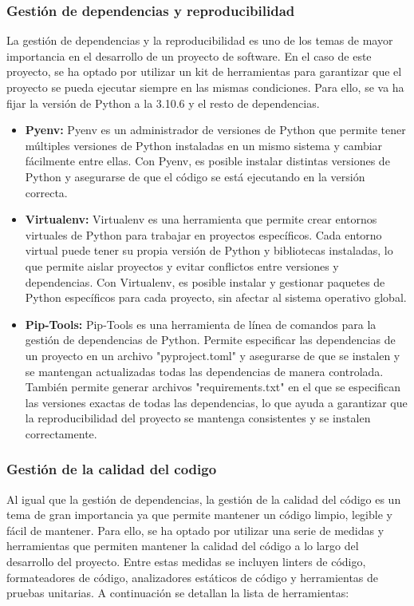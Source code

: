 \subsubsection{Gestión de dependencias y reproducibilidad}
La gestión de dependencias y la reproducibilidad es uno de los temas de mayor importancia en el 
desarrollo de un proyecto de software. En el caso de este proyecto, se ha optado por utilizar 
un kit de herramientas para garantizar que el proyecto se pueda ejecutar siempre en las mismas 
condiciones. Para ello, se va ha fijar la versión de Python a la 3.10.6 y el resto de dependencias. 

\begin{itemize}
    \item \textbf{Pyenv: } Pyenv\cite{pyenv} es un administrador 
    de versiones de Python que permite tener múltiples versiones de Python instaladas en un mismo sistema 
    y cambiar fácilmente entre ellas. Con Pyenv, es posible instalar distintas versiones de 
    Python y asegurarse de que el código se está ejecutando en la versión correcta. 
    
    \item \textbf{Virtualenv: } Virtualenv\cite{Virtualenv} es una herramienta que permite crear entornos virtuales de Python para trabajar 
    en proyectos específicos. Cada entorno virtual puede tener su propia versión de Python y bibliotecas instaladas, 
    lo que permite aislar proyectos y evitar conflictos entre versiones y dependencias. Con Virtualenv, 
    es posible instalar y gestionar paquetes de Python específicos para cada proyecto, sin afectar 
    al sistema operativo global.

    \item \textbf{Pip-Tools: } Pip-Tools\cite{Pip-tools} es una herramienta de línea de comandos para la gestión de 
    dependencias de Python. Permite especificar las dependencias de un proyecto en un archivo 
    "pyproject.toml" y asegurarse de que se instalen y se mantengan actualizadas todas las dependencias 
    de manera controlada. También permite generar archivos "requirements.txt" en el que se especifican las 
    versiones exactas de todas las dependencias, lo que ayuda a garantizar que la reproducibilidad del 
    proyecto se mantenga consistentes y se instalen correctamente.

\end{itemize}


\subsubsection{Gestión de la calidad del codigo}
Al igual que la gestión de dependencias, la gestión de la calidad del código es un tema de gran importancia
ya que permite mantener un código limpio, legible y fácil de mantener. Para ello, se ha optado por utilizar
una serie de medidas y herramientas que permiten mantener la calidad del código a lo largo del desarrollo del proyecto.
Entre estas medidas se incluyen linters de código, formateadores de código, analizadores estáticos de código y
herramientas de pruebas unitarias. A continuación se detallan la lista de herramientas:


